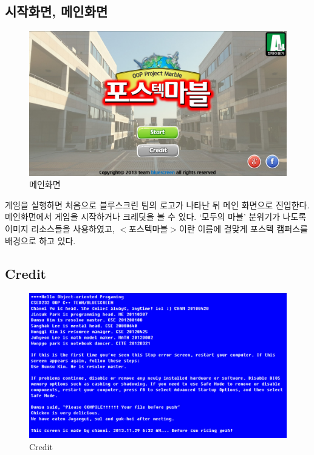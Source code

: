 \documentclass[10pt,oneside,a4paper,titlepage]{article}
\begin{document}
\subsection{시작화면, 메인화면}

\begin{figure}[H]
\centerline{\includegraphics[scale=0.65]{images/1Main}}
\caption{메인화면}
\end{figure}

 게임을 실행하면 처음으로 블루스크린 팀의 로고가 나타난 뒤 메인 화면으로 진입한다. 메인화면에서 게임을 시작하거나 크레딧을 볼 수 있다. ‘모두의 마블’ 분위기가 나도록 이미지 리소스들을 사용하였고, $<$포스텍마블$>$이란 이름에 걸맞게 포스텍 캠퍼스를 배경으로 하고 있다.
 
 
\subsection{Credit}
\begin{figure}[H]
\centerline{\includegraphics[scale=0.65]{images/2Credit}}
\caption{Credit}
\end{figure}
\end{document}
